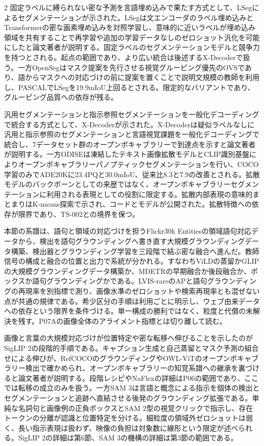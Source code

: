 \documentclass[lualatex,a4paper,10pt]{jlreq}
\begin{document}
\begin{multicols}{2}
\noindent 固定ラベルに縛られない密な予測を言語埋め込みで果たす方式として、LSegによるセグメンテーションが示された。LSegは文エンコーダのラベル埋め込みとTransformerの密な画素埋め込みを対照学習し、意味的に近いラベルが埋め込み領域を共有することで再学習や追加の学習データなしのゼロショット汎化を可能にしたと論文著者が説明する。固定ラベルのセグメンテーションモデルと競争力を持つとされる。起点の範囲であり、より広い統合は後述するX-Decoderで扱う。一方OpenSegはマスク提案を先行させる視覚グルーピング優先のOVSであり、語からマスクへの対応づけの前に提案を置くことで説明文規模の教師を利用し、PASCALでLSegを19.9mIoU上回るとされる。限定的なバリアントであり、グルーピング品質への依存が残る。\autocite{vmd052,vmd054}\par\medskip
\noindent 汎用セグメンテーションと指示参照セグメンテーションを一般化デコーディングで統合する方式として、X-Decoderが示された。X-Decoderは疑似ラベルなしに汎用と指示参照のセグメンテーションと言語視覚課題を一般化デコーディングで統合し、7データセット群のオープンボキャブラリーで到達点を示すと論文著者が説明する。一方ODISEは凍結したテキスト画像拡散モデルとCLIP識別基盤によりオープンボキャブラリーパノプティックセグメンテーションを行い、COCO学習のみでADE20Kに23.4PQと30.0mIoU、従来比8.3と7.9の改善とされる。拡散モデルのバックボーンとしての来歴ではなく、オープンボキャブラリーセグメンテーションに利用される表現としての役割に限定する。拡散内部表現の意味的まとまりはK-means探索で示され、コードとモデルが公開された。拡散特徴への依存が限界であり、TS-002との境界を保つ。\autocite{vmd053,vmd055}\par\medskip
\noindent 本節の系譜は、語句と領域の対応づけを担うFlickr30k Entitiesの領域語句対応データから、検出を語句グラウンディングへ書き直す大規模グラウンディングデータ構築、検出器とグラウンディング学習を三段階で結ぶ密な融合へ進んだ。教師信号の構成と融合の位置と出力で系統が分かれる。すなわちViLDの蒸留かGLIPの大規模グラウンディングデータ構築か、MDETRの早期融合か後段融合か、ボックスか語句グラウンディングかである。LVIS-rareのAPと語句グラウンディングの再現率を別指標で測り、画像水準のゼロショットや検索再現率とも混ぜない点が共通の規律である。希少区分の手順は利用ごとに明示し、ウェブ由来データへの依存という限界を条件づける。単一構成の勝利ではなく、粒度と代償の未解決を残す。P07Aの画像全体のアライメント指標とは切り離して読む。\autocite{vmd041,vmd044,vmd047,vmd048,vmd049,vmd050,vmd056}\par\medskip
\noindent 画像と言葉の大規模対応づけが位置特定や密な転移へ伸びることを示したのがSigLIP 2の段階的手順である。キャプション生成と自己蒸留とマスク予測の組合せによる伸びが、RefCOCOのグラウンディングやOWL-ViTのオープンボキャブラリー検出で確かめられ、オープンボキャブラリーの知覚系譜への継承を裏づけると論文著者が説明する。段階レシピやNaFlexの詳細はP06の範囲であり、ここでは転移の成立のみを扱う。一方SAM 3は言語と概念による指示を個体の検出とセグメンテーションと追跡へ直結させる後発のグラウンディング拡張である。単純な名詞句と画像例の正負ボックスとSAM 2型の視覚クリックで指示し、存在トークンの分離が認識と位置特定を分ける。細粒度の領域外ゼロショットは弱く、長い指示表現は扱わず、映像の負担は対象数に線形という限定が述べられる。SigLIP 2の詳細は第6節、SAM 3の機構の詳細は第3節の範囲である。\autocite{vmd114,vmd115}\par\medskip
\end{multicols}
\end{document}
